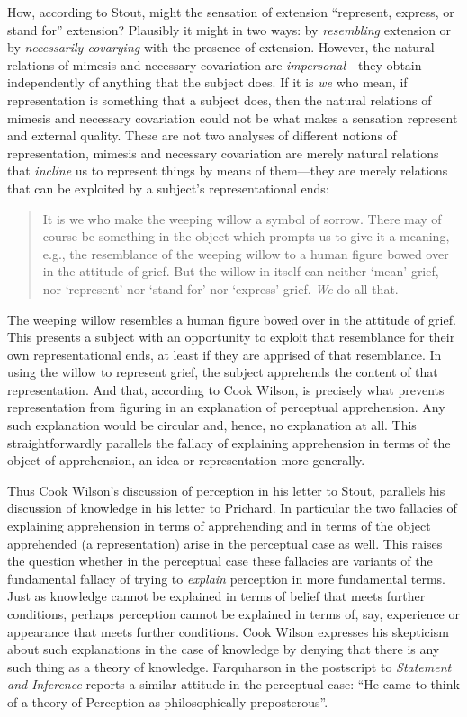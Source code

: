 How, according to Stout, might the sensation of extension ``represent, express, or stand for'' extension? Plausibly it might in two ways: by \emph{resembling} extension or by \emph{necessarily covarying} with the presence of extension. However, the natural relations of mimesis and necessary covariation are \emph{impersonal}---they obtain independently of anything that the subject does. If it is \emph{we} who mean, if representation is something that a subject does, then the natural relations of mimesis and necessary covariation could not be what makes a sensation represent and external quality. These are not two analyses of different notions of representation, mimesis and necessary covariation are merely natural relations that \emph{incline} us to represent things by means of them---they are merely relations that can be exploited by a subject's representational ends:
\begin{quote}
	It is we who make the weeping willow a symbol of sorrow. There may of course be something in the object which prompts us to give it a meaning, e.g., the resemblance of the weeping willow to a human figure bowed over in the attitude of grief. But the willow in itself can neither `mean' grief, nor `represent' nor `stand for' nor `express' grief. \emph{We} do all that.  \citep[770]{Cook-Wilson:1926sf}
\end{quote}
The weeping willow resembles a human figure bowed over in the attitude of grief. This presents a subject with an opportunity to exploit that resemblance for their own representational ends, at least if they are apprised of that resemblance. In using the willow to represent grief, the subject apprehends the content of that representation. And that, according to Cook Wilson, is precisely what prevents representation from figuring in an explanation of perceptual apprehension. Any such explanation would be circular and, hence, no explanation at all. This straightforwardly parallels the fallacy of explaining apprehension in terms of the object of apprehension, an idea or representation more generally.

Thus Cook Wilson's discussion of perception in his letter to Stout, parallels his discussion of knowledge in his letter to Prichard. In particular the two fallacies of explaining apprehension in terms of apprehending and in terms of the object apprehended (a representation) arise in the perceptual case as well. This raises the question whether in the perceptual case these fallacies are variants of the fundamental fallacy of trying to \emph{explain} perception in more fundamental terms. Just as knowledge cannot be explained in terms of belief that meets further conditions, perhaps perception cannot be explained in terms of, say, experience or appearance that meets further conditions. Cook Wilson expresses his skepticism about such explanations in the case of knowledge by denying that there is any such thing as a theory of knowledge. Farquharson in the postscript to \emph{Statement and Inference} reports a similar attitude in the perceptual case: ``He came to think of a theory of Perception as philosophically preposterous''. 

